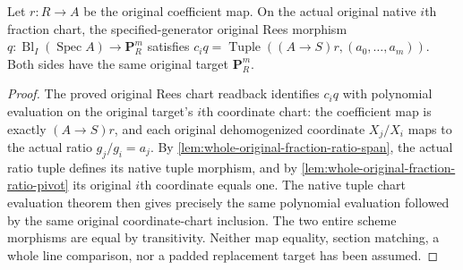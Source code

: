 \begin{proposition}
\label{prop:whole-original-rees-fraction-ratio-map}
\leanok
Let $r:R\to A$ be the original coefficient map. On the actual original native
$i$th fraction chart, the specified-generator original Rees morphism
$q:\operatorname{Bl}_I(\operatorname{Spec}A)\to\mathbf P_R^m$ satisfies
$c_iq=\operatorname{Tuple}((A\to S)r,(a_0,\ldots,a_m))$.
Both sides have the same original target $\mathbf P_R^m$.
\end{proposition}
\begin{proof}
The proved original Rees chart readback identifies $c_iq$ with
polynomial evaluation on the original target's $i$th coordinate chart: the
coefficient map is exactly $(A\to S)r$, and each original dehomogenized
coordinate $X_j/X_i$ maps to the actual ratio $g_j/g_i=a_j$.
By \ref{lem:whole-original-fraction-ratio-span}, the actual ratio tuple defines
its native tuple morphism, and by \ref{lem:whole-original-fraction-ratio-pivot}
its original $i$th coordinate equals one. The native tuple chart evaluation
theorem then gives precisely the same polynomial evaluation followed by the
same original coordinate-chart inclusion. The two entire scheme morphisms
are equal by transitivity. Neither map equality, section matching, a whole
line comparison, nor a padded replacement target has been assumed.
\end{proof}
